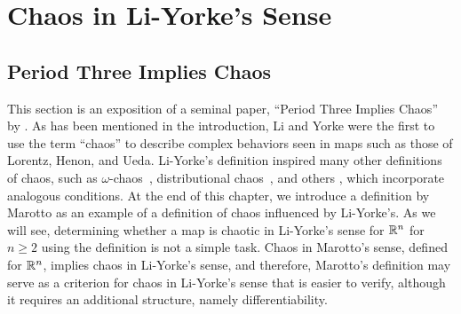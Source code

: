 \documentclass[10pt,draft,twoside]{book}
\begin{document}
\chapter{Chaos in Li-Yorke's Sense}
\label{chap:liyorke}

\section{Period Three Implies Chaos}
This section is an exposition of a seminal paper, ``Period Three Implies Chaos'' by \citet{li-yorke}.
As has been mentioned in the introduction, Li and Yorke were the first to use the term ``chaos'' to describe complex behaviors seen in maps such as those of Lorentz, Henon, and Ueda.
Li-Yorke's definition inspired many other definitions of chaos, such as $\omega$-chaos~\citep{omegachaos}, distributional chaos~\citep{dchaos1}, and others \citep{genericchaos,densechaos,extremechaos}, which incorporate analogous conditions.
At the end of this chapter, we introduce a definition by Marotto as an example of a definition of chaos influenced by Li-Yorke's.
As we will see, determining whether a map is chaotic in Li-Yorke's sense for $\mathbb{R}^n$ for $n \geq 2$ using the definition is not a simple task.
Chaos in Marotto's sense, defined for $\mathbb{R}^n$, implies chaos in Li-Yorke's sense, and therefore, Marotto's definition may serve as a criterion for chaos in Li-Yorke's sense that is easier to verify, although it requires an additional structure, namely differentiability.

\end{document}
